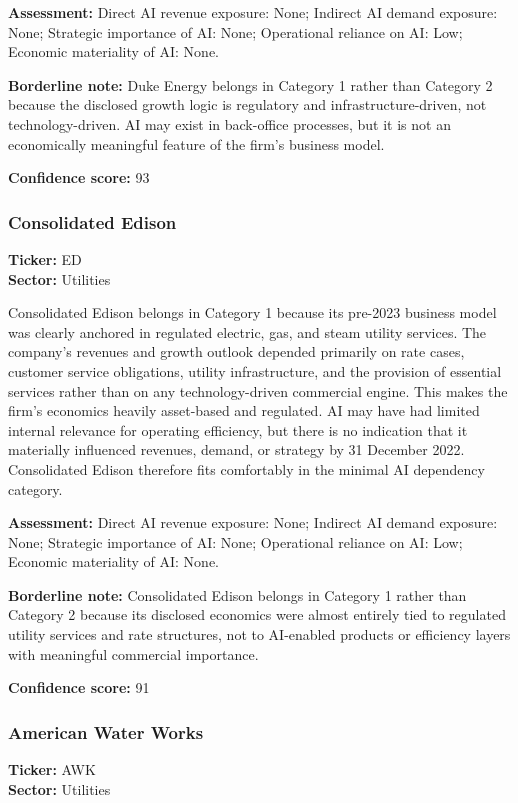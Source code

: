 \documentclass{article}
\begin{document}
\textbf{Assessment:} Direct AI revenue exposure: None; Indirect AI demand exposure: None; Strategic importance of AI: None; Operational reliance on AI: Low; Economic materiality of AI: None.

\textbf{Borderline note:} Duke Energy belongs in Category 1 rather than Category 2 because the disclosed growth logic is regulatory and infrastructure-driven, not technology-driven. AI may exist in back-office processes, but it is not an economically meaningful feature of the firm’s business model.

\textbf{Confidence score:} 93

\subsubsection*{Consolidated Edison}
\textbf{Ticker:} ED \\
\textbf{Sector:} Utilities

Consolidated Edison belongs in Category 1 because its pre-2023 business model was clearly anchored in regulated electric, gas, and steam utility services. The company’s revenues and growth outlook depended primarily on rate cases, customer service obligations, utility infrastructure, and the provision of essential services rather than on any technology-driven commercial engine. This makes the firm’s economics heavily asset-based and regulated. AI may have had limited internal relevance for operating efficiency, but there is no indication that it materially influenced revenues, demand, or strategy by 31 December 2022. Consolidated Edison therefore fits comfortably in the minimal AI dependency category.

\textbf{Assessment:} Direct AI revenue exposure: None; Indirect AI demand exposure: None; Strategic importance of AI: None; Operational reliance on AI: Low; Economic materiality of AI: None.

\textbf{Borderline note:} Consolidated Edison belongs in Category 1 rather than Category 2 because its disclosed economics were almost entirely tied to regulated utility services and rate structures, not to AI-enabled products or efficiency layers with meaningful commercial importance.

\textbf{Confidence score:} 91

\subsubsection*{American Water Works}
\textbf{Ticker:} AWK \\
\textbf{Sector:} Utilities
\end{document}
